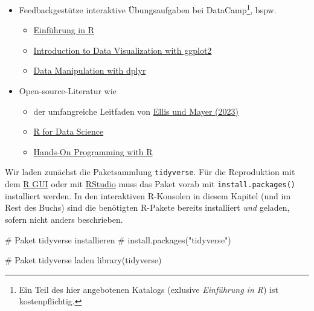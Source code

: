 \documentclass[
  a4paper,
  DIV=11,
  oneside]{scrreprt}
\newenvironment{Shaded}{\begin{snugshade}}{\end{snugshade}}
\newcommand{\CommentTok}[1]{\textcolor[rgb]{0.37,0.37,0.37}{#1}}
\newcommand{\FunctionTok}[1]{\textcolor[rgb]{0.28,0.35,0.67}{#1}}
\newcommand{\NormalTok}[1]{\textcolor[rgb]{0.00,0.23,0.31}{#1}}
\providecommand{\tightlist}{%
  \setlength{\itemsep}{0pt}\setlength{\parskip}{0pt}}\usepackage{longtable,booktabs,array}
\begin{document}
\begin{itemize}
\item
  Feedbackgestütze interaktive Übungsaufgaben bei DataCamp\footnote{Ein
    Teil des hier angebotenen Katalogs (exlusive \emph{Einführung in R})
    ist kostenpflichtig.}, bspw.

  \begin{itemize}
  \tightlist
  \item
    \href{https://campus.datacamp.com/courses/einfuhrung-in-r/}{Einführung
    in R}
  \item
    \href{https://www.datacamp.com/courses/introduction-to-data-visualization-with-ggplot2}{Introduction
    to Data Visualization with ggplot2}
  \item
    \href{https://www.datacamp.com/courses/data-manipulation-with-dplyr}{Data
    Manipulation with dplyr}
  \end{itemize}
\item
  Open-source-Literatur wie

  \begin{itemize}
  \tightlist
  \item
    der umfangreiche Leitfaden von
    \href{https://methodenlehre.github.io/einfuehrung-in-R/}{Ellis und
    Mayer (2023)}
  \item
    \href{https://r4ds.hadley.nz/}{R for Data Science}
  \item
    \href{https://rstudio-education.github.io/hopr/}{Hands-On
    Programming with R}
  \end{itemize}
\end{itemize}

Wir laden zunächst die Paketsammlung \texttt{tidyverse}. Für die
Reproduktion mit dem \href{https://www.r-project.org/}{R GUI} oder mit
\href{https://posit.co/download/rstudio-desktop/}{RStudio} muss das
Paket vorab mit \texttt{install.packages()} installiert werden. In den
interaktiven R-Konsolen in diesem Kapitel (und im Rest des Buchs) sind
die benötigten R-Pakete bereits installiert \emph{und} geladen, sofern
nicht anders beschrieben.

\begin{Shaded}
\begin{Highlighting}[]
\CommentTok{\# Paket tidyverse installieren}
\CommentTok{\# install.packages("tidyverse")}

\CommentTok{\# Paket \textquotesingle{}tidyverse\textquotesingle{} laden}
\FunctionTok{library}\NormalTok{(tidyverse)}
\end{Highlighting}
\end{Shaded}
\end{document}
